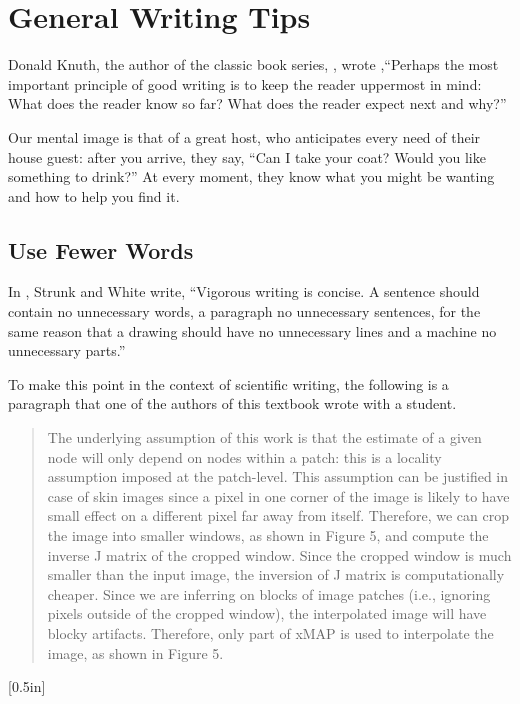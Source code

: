 \section{General Writing Tips}

Donald Knuth, the author of the classic book series, , wrote \cite{Knuth1989},``Perhaps the most important principle of good writing is to keep the reader uppermost in mind:  What does the reader know so far?  What does the reader expect next and why?''

Our mental image is that of a great host, who anticipates every need of their house guest: after you arrive, they say, ``Can I take your coat?  Would you like something to drink?''  At every moment, they know what you might be wanting and how to help you find it.

\subsection{Use Fewer Words}

In  \cite{Strunk}, Strunk and White write, ``Vigorous writing is concise.  A sentence should contain no unnecessary words, a paragraph no unnecessary sentences, for the same reason that a drawing should have no unnecessary lines and a machine no unnecessary parts.''

To make this point in the context of scientific writing, the following is a paragraph that one of the authors of this textbook wrote with a student.  

\begin{quote}
The underlying assumption of this work is that the estimate of a given
node will only depend on nodes within a patch:  this is a locality
assumption imposed at the patch-level. This assumption can be
justified in case of skin images since a pixel in one corner of the
image is likely to have small effect on a different pixel far away
from itself.  Therefore, we can crop the image into smaller windows,
as shown in Figure 5, and compute the inverse J matrix of the cropped
window.  Since the cropped window is much smaller than the input
image, the inversion of J matrix is computationally cheaper.  Since we
are inferring on blocks of image patches (i.e., ignoring pixels outside
of the cropped window), the interpolated image will have blocky
artifacts.  Therefore, only part of xMAP is used to interpolate the
image, as shown in Figure 5.
\end{quote}
[0.5in]


